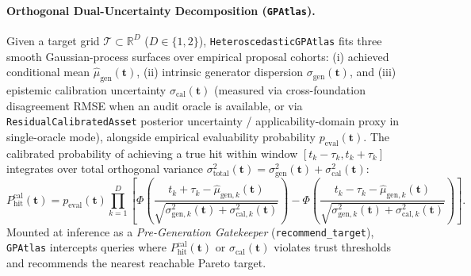 \documentclass[11pt,a4paper]{article}
\begin{document}
\paragraph{Orthogonal Dual-Uncertainty Decomposition (\texttt{GPAtlas}).}
Given a target grid $\mathcal{T} \subset \mathbb{R}^D$ ($D \in \{1, 2\}$), \texttt{HeteroscedasticGPAtlas} fits three smooth Gaussian-process surfaces over empirical proposal cohorts: (i) achieved conditional mean $\hat{\mu}_{\text{gen}}(\mathbf{t})$, (ii) intrinsic generator dispersion $\sigma_{\text{gen}}(\mathbf{t})$, and (iii) epistemic calibration uncertainty $\sigma_{\text{cal}}(\mathbf{t})$ (measured via cross-foundation disagreement RMSE when an audit oracle is available, or via \texttt{ResidualCalibratedAsset} posterior uncertainty / applicability-domain proxy in single-oracle mode), alongside empirical evaluability probability $p_{\text{eval}}(\mathbf{t})$. The calibrated probability of achieving a true hit within window $[t_k - \tau_k, t_k + \tau_k]$ integrates over total orthogonal variance $\sigma_{\text{total}}^2(\mathbf{t}) = \sigma_{\text{gen}}^2(\mathbf{t}) + \sigma_{\text{cal}}^2(\mathbf{t})$:
\begin{equation}
\label{eq:phit}
P_{\text{hit}}^{\text{cal}}(\mathbf{t}) = p_{\text{eval}}(\mathbf{t}) \prod_{k=1}^D \left[ \Phi\!\left(\frac{t_k + \tau_k - \hat{\mu}_{\text{gen}, k}(\mathbf{t})}{\sqrt{\sigma_{\text{gen}, k}^2(\mathbf{t}) + \sigma_{\text{cal}, k}^2(\mathbf{t})}}\right) - \Phi\!\left(\frac{t_k - \tau_k - \hat{\mu}_{\text{gen}, k}(\mathbf{t})}{\sqrt{\sigma_{\text{gen}, k}^2(\mathbf{t}) + \sigma_{\text{cal}, k}^2(\mathbf{t})}}\right) \right].
\end{equation}
Mounted at inference as a \emph{Pre-Generation Gatekeeper} (\texttt{recommend\_target}), \texttt{GPAtlas} intercepts queries where $P_{\text{hit}}^{\text{cal}}(\mathbf{t})$ or $\sigma_{\text{cal}}(\mathbf{t})$ violates trust thresholds and recommends the nearest reachable Pareto target.
\end{document}
